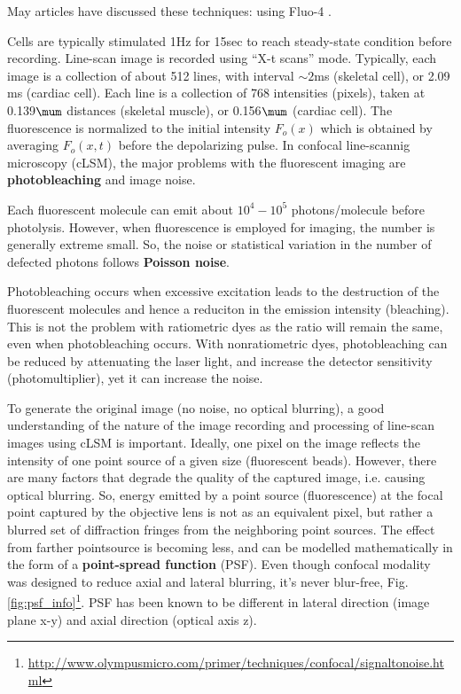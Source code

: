 May articles have discussed these techniques: using Fluo-4
\citep{guatimosim2011}.

Cells are typically stimulated 1Hz for 15sec to reach steady-state condition
before recording. Line-scan image is recorded using ``X-t scans'' mode.
Typically, each image is a collection of about 512 lines, with interval $\sim
2$ms (skeletal cell), or 2.09 ms (cardiac cell). Each line is a collection of
768 intensities (pixels), taken at 0.139$\mum$ distances (skeletal muscle), or
0.156$\mum$ (cardiac cell). The fluorescence is normalized to the initial
intensity $F_o(x)$ which is obtained by averaging $F_o(x,t)$ before the
depolarizing pulse.
In confocal line-scannig microscopy (cLSM), the major problems with the
fluorescent imaging are {\bf photobleaching} and image  noise.

\begin{framed}
 Each fluorescent molecule can emit about $10^4-10^5$ photons/molecule before
 photolysis. However, when fluorescence is employed for imaging, the number
 is generally extreme small. So, the noise or statistical variation in the
 number of defected photons follows {\bf Poisson noise}.
 
 Photobleaching occurs when excessive excitation leads to the destruction of the
 fluorescent molecules and hence a reduciton in the emission intensity
 (bleaching). This is not the problem with ratiometric dyes as the ratio will
 remain the same, even when photobleaching occurs. With nonratiometric dyes,
 photobleaching can be reduced by attenuating the laser light, and increase the
 detector sensitivity (photomultiplier), yet it can increase the noise.
\end{framed}

To generate the original image (no noise, no optical blurring), a good
understanding of the nature of the image recording and processing of line-scan
images using cLSM is important. Ideally, one pixel on the image reflects the
intensity of one point source of a given size (fluorescent beads). However,
there are many factors that degrade the quality of the captured image, i.e.
causing optical blurring. So, energy emitted by a point source (fluorescence) at
the focal point captured by the objective lens is not as an equivalent pixel,
but rather a blurred set of diffraction fringes from the neighboring point
sources. The effect from farther pointsource is becoming less, and can be
modelled mathematically in the form of a {\bf point-spread function} (PSF).
Even though confocal modality was designed to reduce axial and lateral blurring,
it's never blur-free,
Fig.\ref{fig:psf_info}\footnote{\url{http://www.olympusmicro.com/primer/techniques/confocal/signaltonoise.html}}.
PSF has been known to be different in lateral direction (image plane x-y) and
axial direction (optical axis z).


